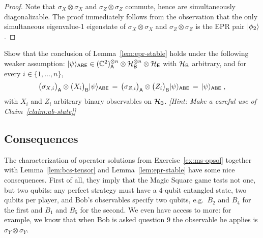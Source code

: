 \begin{proof}
Note that $\sigma_X\otimes \sigma_X$ and $\sigma_Z\otimes \sigma_Z$ commute, hence are simultaneously diagonalizable. 
The proof immediately follows from the observation that the only simultaneous eigenvalue-1 eigenstate of $\sigma_X\otimes \sigma_X$ and $\sigma_Z\otimes \sigma_Z$ is the EPR pair $|\phi_2\rangle$. 
\end{proof}

\begin{exercise}
Show that the conclusion of Lemma~\ref{lem:epr-stable} holds under the following weaker assumption: $|\psi\rangle_{{\textsf{ABE}}} \in (\mathbb{C}^2)_{\textsf{A}}^{\otimes n} \otimes \mathcal{H}_{\textsf{B}}^{\otimes n} \otimes \mathcal{H}_{\textsf{E}}$ with $\mathcal{H}_{\textsf{B}}$ arbitrary, and for every $i\in \{1,\ldots, n\}$,
\[\big(\sigma_{X,i}\big)_{\textsf{A}} \otimes \big(X_i\big)_{\textsf{B}} |\psi\rangle_{{\textsf{ABE}}} \,=\, \big(\sigma_{Z,i}\big)_{\textsf{A}} \otimes \big(Z_i\big)_{\textsf{B}} |\psi\rangle_{{\textsf{ABE}}} \,=\,|\psi\rangle_{\textsf{ABE}}\;,\]
with $X_i$ and $Z_i$ arbitrary binary observables on $\mathcal{H}_{\textsf{B}}$. \emph{[Hint: Make a careful use of Claim~\ref{claim:ab-state}]}
\end{exercise}


\subsection{Consequences} 
\label{sec:spatial-consequences}

The characterization of operator solutions from Exercise~\ref{ex:ms-opsol} together with Lemma~\ref{lem:bcs-tensor} and Lemma~\ref{lem:epr-stable} have some nice consequences. First of all, they imply that the Magic Square game tests not one, but two qubits: any perfect strategy must have a $4$-qubit entangled state, two qubits per player, and Bob's observables specify two qubits, e.g.\ $B_2$ and $B_4$ for the first and $B_1$ and $B_5$ for the second. We even have access to more: for example, we know that when Bob is asked question $9$ the observable he applies is $\sigma_Y \otimes \sigma_Y$. 

